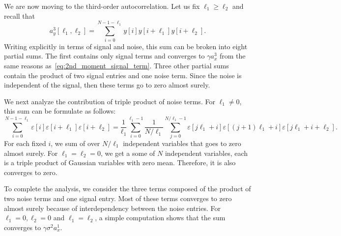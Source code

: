 \documentclass[english,11pt]{article}
\numberwithin{equation}{section}
\theoremstyle{plain}
\theoremstyle{definition}
\theoremstyle{remark}
\theoremstyle{plain}
\theoremstyle{remark}
\theoremstyle{plain}
\theoremstyle{plain}
\begin{document}
We are now moving to the third-order autocorrelation. Let us fix $\ell_1\geq\ell_2$ and recall that 
\begin{equation*}
a_y^3[\ell_1,\ell_2] = \sum_{i=0}^{N-1-\ell_1} y[i]y[i+\ell_1]y[i+\ell_2]. 
\end{equation*}
Writing explicitly in terms of signal and noise, this sum can be broken into eight partial sums. The first contains only signal terms and converges to $\gamma a_x^3$ from the same reasons as~\eqref{eq:2nd_moment_signal_term}. Three other partial sums contain the product of two signal entries and one noise term. Since the noise is independent of the signal, then these terms go to zero almost surely.

We next analyze the contribution of triple product of noise terms. For $\ell_1\neq 0$, this sum can be formulate as follows:
\begin{equation*}
\sum_{i=0}^{N-1-\ell_1} \varepsilon[i]\varepsilon[i+\ell_1]\varepsilon[i+\ell_2] = \frac{1}{\ell_1}\sum_{i=0}^{\ell_1-1}\frac{1}{N/\ell_1}\sum_{j=0}^{N/\ell_1 -1 }\varepsilon[j\ell_1+i]\varepsilon[(j+1)\ell_1+i]\varepsilon[j\ell_1+i+\ell_2].
\end{equation*}
For each fixed $i$, we sum of over $N/\ell_1$ independent variables that goes to zero almost surely. For $\ell_1=\ell_2=0$, we get a some of $N$ independent variables, each is a triple product of Gaussian variables with zero mean. Therefore, it is also converges to zero. 

To complete the analysis, we consider the three terms composed of the product of two noise terms and one signal entry. Most of these terms converges to zero almost surely because of interdependency between the noise entries. For $\ell_1=0, \ell_2=0$ and $\ell_1=\ell_2$,  a simple computation shows that the sum converges to $\gamma\sigma^2a_x^1$.
\end{document}
